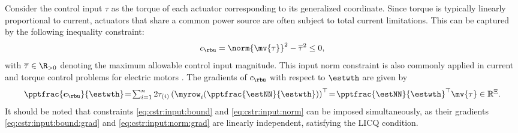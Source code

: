 \documentclass[final,5p,times,twocolumn,authoryear]{elsarticle}
\newcommand*{\template}{template}
\begin{document}
Consider the control input $\tau$ as the torque of each actuator corresponding to its generalized coordinate. Since torque is typically linearly proportional to current, actuators that share a common power source are often subject to total current limitations. This can be captured by the following inequality constraint: 
\begin{equation}
    c_{\rbu}=\norm{\mv{\tau}}^2 -\overline\tau^2  \le 0
    ,
    \label{eq:cstr:input:norm}
\end{equation}
with $\overline\tau\in\R_{>0}$ denoting the maximum allowable control input magnitude. This input norm constraint is also commonly applied in current and torque control problems for electric motors \cite{Choi:2024aa}.
The gradients of $c_{\rbu}$ with respect to $\estwth$ are given by
\begin{equation}
    \pptfrac{\boldsymbol c_{\rbu}}{\estwth}
    \!=\! 
    \textstyle\sum_{i=1}^n 2\tau_{(i)} 
    \left(
        \myrow_i
        (
            \pptfrac{\estNN}{\estwth}
        )
    \right)^\top  
    \!=\! 
    {\pptfrac{\estNN}{\estwth}}^\top
    \mv{\tau}
    \in \mathbb R^{\Xi}.
    \label{eq:cstr:input:norm:grad}
\end{equation}
It should be noted that constraints \eqref{eq:cstr:input:bound} and \eqref{eq:cstr:input:norm} can be imposed simultaneously, as their gradients \eqref{eq:cstr:input:bound:grad} and \eqref{eq:cstr:input:norm:grad} are linearly independent, satisfying the LICQ condition.

 





% 
% 
\end{document}
